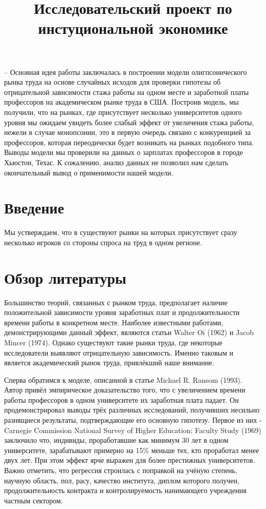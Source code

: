 \documentclass[a4paper, 12pt]{article}
\title{Исследовательский проект по инстуциональной экономике}
\theoremstyle{definition}
\theoremstyle{plain}
\begin{document}
\maketitle

-- Основная идея работы заключалась в построении модели олигпсонического рынка труда на основе случайных исходов для проверки гипотезы об отрицательной зависимости стажа работы на одном месте и заработной платы профессоров на академическом рынке труда в США. Построив модель, мы получили, что на рынках, где присутствует несколько университетов одного уровня мы ожидаем увидеть более слабый эффект от увеличения стажа работы,  нежели в случае монопсонии, это в первую очередь связано с конкуренцией за профессоров, которая переодически будет возникать на рынках подобного типа. Выводы модели мы проверили на данных о зарплатах профессоров в городе Хьюстон, Техас. К сожалению, анализ данных не позволил нам сделать окончательный вывод о применимости нашей модели. 

\section{Введение}
Мы устверждаем, что в существуют рынки на которых присутствует сразу несколько игроков со стороны спроса на труд в одном регионе. 
\section{Обзор литературы}

Большинство теорий, связанных с рынком труда, предполагает наличие положительной зависимости уровня заработных плат и продолжительности времени работы в конкретном месте. Наиболее известными работами, демонстрирующими данный эффект, являются статьи Walter Oi (1962) и Jacob Mincer (1974). Однако существуют такие рынки труда, где некоторые исследователи выявляют отрицательную зависимость. Именно таковым и является академический рынок труда, привлёкший наше внимание. 

Сперва обратимся к моделе, описанной в статье Michael R. Ransom (1993). Автор привёл эмпирическое доказательство того, что с увеличением времени работы профессоров в одном университете их заработная плата падает. Он продемонстрировал выводы трёх различных исследований, получивших несильно разнящиеся результаты, подтверждающие его основную гипотезу. Первое из них - Carnegie Commission National Survey of Higher Education: Faculty Study (1969) заключило что, индивиды, проработавшие как минимум 30 лет в одном университете, зарабатывают примерно на 15\%  меньше тех, кто проработал менее двух лет. При этом эффект ярче выражен для более престижных университетов. Важно отметить, что регрессия строилась с поправкой на учёную степень, научную область, пол, расу, качество института, диплом которого получен, продолжительность контракта и контролируемость нанимающего учреждения частным сектором. 
\end{document}
